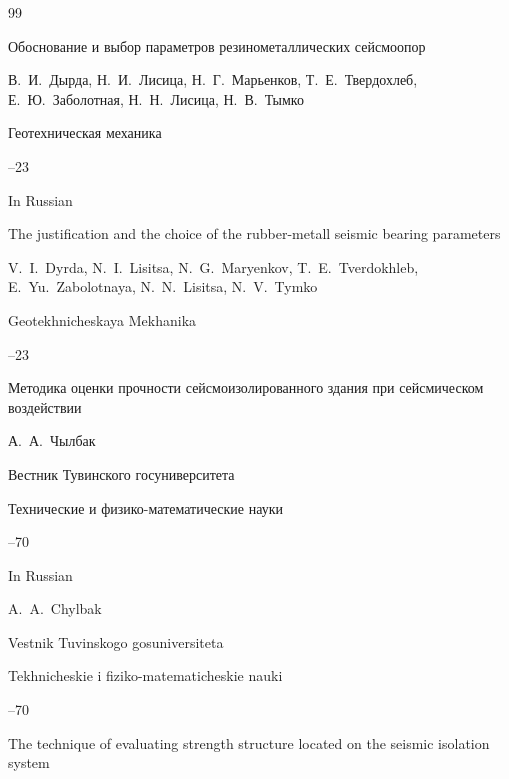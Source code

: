 \begin{thebibliography}{99}




\paper Обоснование и выбор параметров резинометаллических сейсмоопор

\by В.~И.~Дырда, Н.~И.~Лисица, Н.~Г.~Марьенков, Т.~Е.~Твердохлеб, Е.~Ю.~Заболотная, Н.~Н.~Лисица, Н.~В.~Тымко

\jour Геотехническая механика



--23

\misctransl

\lang In Russian

\paper The justification and the choice of the rubber-metall seismic bearing parameters

\by V.~I.~Dyrda, N.~I.~Lisitsa, N.~G.~Maryenkov, T.~E.~Tverdokhleb, E.~Yu.~Zabolotnaya, N.~N.~Lisitsa, N.~V.~Tymko

\jour Geotekhnicheskaya Mekhanika



--23




\paper  Методика оценки прочности сейсмоизолированного здания при сейсмическом воздействии

\by А.~А.~Чылбак

\jour Вестник Тувинского госуниверситета



\issueinfo Технические и физико-математические науки

--70


\misctransl

\lang In Russian

\by A.~A.~Chylbak

\jour Vestnik Tuvinskogo gosuniversiteta



\issueinfo Tekhnicheskie i fiziko-matematicheskie nauki

--70

\paper The technique of evaluating strength structure located on the seismic isolation system






\end{thebibliography}
